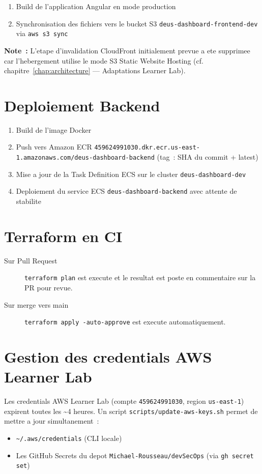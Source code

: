 \begin{enumerate}
    \item Build de l'application Angular en mode production
    \item Synchronisation des fichiers vers le bucket S3
        \texttt{deus-dashboard-frontend-dev} via \texttt{aws s3 sync}
\end{enumerate}

\textbf{Note~:} L'etape d'invalidation CloudFront initialement prevue a ete
supprimee car l'hebergement utilise le mode S3 Static Website Hosting
(cf. chapitre~\ref{chap:architecture} --- Adaptations Learner Lab).

\section{Deploiement Backend}

\begin{enumerate}
    \item Build de l'image Docker
    \item Push vers Amazon ECR
        \texttt{459624991030.dkr.ecr.us-east-1.amazonaws.com/deus-dashboard-backend}
        (tag~: SHA du commit + latest)
    \item Mise a jour de la Task Definition ECS sur le cluster
        \texttt{deus-dashboard-dev}
    \item Deploiement du service ECS \texttt{deus-dashboard-backend}
        avec attente de stabilite
\end{enumerate}

\section{Terraform en CI}

\begin{description}
    \item[Sur Pull Request] \texttt{terraform plan} est execute et le resultat
        est poste en commentaire sur la PR pour revue.
    \item[Sur merge vers main] \texttt{terraform apply -auto-approve} est execute
        automatiquement.
\end{description}

\section{Gestion des credentials AWS Learner Lab}

Les credentials AWS Learner Lab (compte \texttt{459624991030}, region
\texttt{us-east-1}) expirent toutes les \~{}4 heures.
Un script \texttt{scripts/update-aws-keys.sh} permet de mettre a jour
simultanement~:
\begin{itemize}
    \item \texttt{\~{}/.aws/credentials} (CLI locale)
    \item Les GitHub Secrets du depot \texttt{Michael-Rousseau/devSecOps}
        (via \texttt{gh secret set})
\end{itemize}

